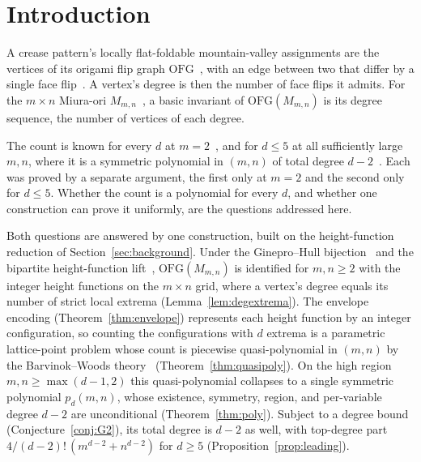 \documentclass[11pt]{article}
\theoremstyle{definition}
\theoremstyle{remark}
\newcommand{\OFG}{\mathrm{OFG}}
\newcommand{\Mm}{M_{m,n}}
\begin{document}
\section{Introduction}\label{sec:intro}

A crease pattern's locally flat-foldable mountain-valley assignments are the
vertices of its origami flip graph $\OFG$~\cite{Hull2022maximal}, with an edge
between two that differ by a single face flip~\cite{Akitaya2020faceflips}. A
vertex's degree is then the number of face flips it admits. For the $m\times n$
Miura-ori $\Mm$~\cite{Miura1994map}, a basic invariant of $\OFG(\Mm)$ is its
degree sequence, the number of vertices of each degree.

The count is known for every $d$ at $m=2$~\cite{Christensen2025origami}, and
for $d\le5$ at all sufficiently large $m,n$, where it is a symmetric
polynomial in $(m,n)$ of total degree $d-2$~\cite{Gupta2026companion}. Each was
proved by a separate argument, the first only at $m=2$ and the second only for
$d\le5$. Whether the count is a polynomial for every $d$, and whether one
construction can prove it uniformly, are the questions addressed here.

Both questions are answered by one construction, built on the height-function
reduction of Section~\ref{sec:background}. Under the Ginepro--Hull
bijection~\cite{GineproHull2014counting} and the bipartite height-function
lift~\cite{Cereceda2009mixing}, $\OFG(\Mm)$ is identified for $m,n\ge2$ with the
integer height functions on the $m\times n$ grid, where a vertex's degree equals
its number of strict local extrema (Lemma~\ref{lem:degextrema}). The envelope
encoding (Theorem~\ref{thm:envelope}) represents each height function by an
integer configuration, so counting the configurations with $d$ extrema is a
parametric lattice-point problem whose count is piecewise quasi-polynomial in $(m,n)$ by the
Barvinok--Woods theory~\cite{BarvinokWoods2003,BogartWoods2022}
(Theorem~\ref{thm:quasipoly}). On the high region $m,n\ge\max(d-1,2)$ this
quasi-polynomial collapses to a single symmetric polynomial $p_d(m,n)$, whose
existence, symmetry, region, and per-variable degree $d-2$ are unconditional
(Theorem~\ref{thm:poly}). Subject to a degree bound (Conjecture~\ref{conj:G2}),
its total degree is $d-2$ as well, with top-degree part
$4/(d-2)!\,(m^{d-2}+n^{d-2})$ for $d\ge5$ (Proposition~\ref{prop:leading}).
\end{document}

